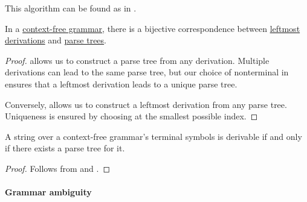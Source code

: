\begin{comments}
  \item This algorithm can be found as  in \cite{code}.
\end{comments}

\begin{proposition}\label{thm:derivations_and_parse_trees}
  In a \hyperref[def:chomsky_hierarchy/context_free]{context-free grammar}, there is a bijective correspondence between \hyperref[def:leftmost_derivation]{leftmost derivations} and \hyperref[def:parse_tree]{parse trees}.
\end{proposition}
\begin{proof}
   allows us to construct a parse tree from any derivation. Multiple derivations can lead to the same parse tree, but our choice of nonterminal in  ensures that a leftmost derivation leads to a unique parse tree.

  Conversely,  allows us to construct a leftmost derivation from any parse tree. Uniqueness is ensured by choosing at  the smallest possible index.
\end{proof}

\begin{corollary}\label{thm:parse_tree_existence}
   A string over a context-free grammar's terminal symbols is derivable if and only if there exists a parse tree for it.
\end{corollary}
\begin{proof}
  Follows from  and .
\end{proof}

\paragraph{Grammar ambiguity}

